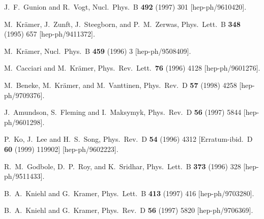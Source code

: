 \begin{thebibliography}{999}
J.~F.~Gunion and R.~Vogt,
Nucl.\ Phys.\ B {\bf 492} (1997) 301
[hep-ph/9610420].



M.~Kr\"amer, J.~Zunft, J.~Steegborn, and P.~M.~Zerwas,
Phys.\ Lett.\ B {\bf 348} (1995) 657
[hep-ph/9411372].

M.~Kr\"amer,
Nucl.\ Phys.\ B {\bf 459} (1996) 3
[hep-ph/9508409].

M.~Cacciari and M.~Kr\"amer,
Phys.\ Rev.\ Lett.\  {\bf 76} (1996) 4128
[hep-ph/9601276].

M.~Beneke, M.~Kr\"amer, and M.~Vanttinen,
Phys.\ Rev.\ D {\bf 57} (1998) 4258
[hep-ph/9709376].

J.~Amundson, S.~Fleming and I.~Maksymyk,
Phys.\ Rev.\ D {\bf 56} (1997) 5844
[hep-ph/9601298].

P.~Ko, J.~Lee and H.~S.~Song,
Phys.\ Rev.\ D {\bf 54} (1996) 4312
[Erratum-ibid.\ D {\bf 60} (1999) 119902]
[hep-ph/9602223].

R.~M.~Godbole, D.~P.~Roy, and K.~Sridhar,
Phys.\ Lett.\ B {\bf 373} (1996) 328
[hep-ph/9511433].

B.~A.~Kniehl and G.~Kramer,
Phys.\ Lett.\ B {\bf 413} (1997) 416
[hep-ph/9703280].

B.~A.~Kniehl and G.~Kramer,
Phys.\ Rev.\ D {\bf 56} (1997) 5820
[hep-ph/9706369].


\end{thebibliography}
